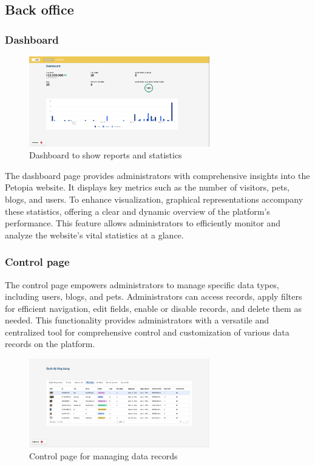 \newpage
\subsection{Back office}

\subsubsection{Dashboard}

\begin{figure}[H]
    \centering
    \includegraphics[width=0.7\textwidth]{Figures/UI/dashboard_bo_ui.png}
    \caption{Dashboard to show reports and statistics}
\end{figure}

The dashboard page provides administrators with comprehensive insights into the Petopia website. It displays key metrics such as the number of visitors, pets, blogs, and users. To enhance visualization, graphical representations accompany these statistics, offering a clear and dynamic overview of the platform's performance. This feature allows administrators to efficiently monitor and analyze the website's vital statistics at a glance.

\subsubsection{Control page}

The control page empowers administrators to manage specific data types, including users, blogs, and pets. Administrators can access records, apply filters for efficient navigation, edit fields, enable or disable records, and delete them as needed. This functionality provides administrators with a versatile and centralized tool for comprehensive control and customization of various data records on the platform.

\begin {figure}[H]
\centering
\includegraphics[width=0.7\textwidth]{Figures/UI/control_bo_ui.png}
\caption{Control page for managing data records}
\end{figure}

